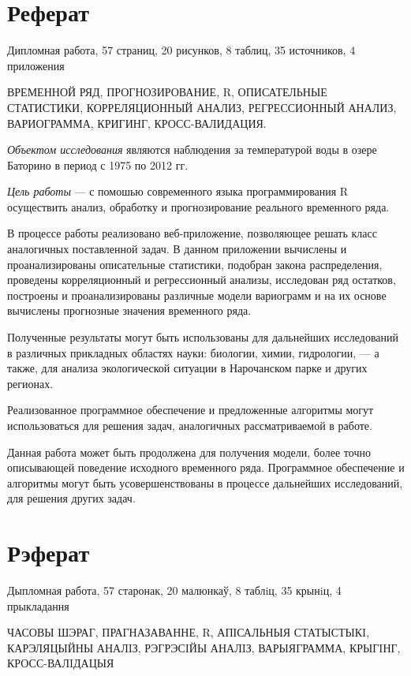 \newpage

\chapter*{Реферат}
Дипломная работа, 57 страниц, 20 рисунков, 8 таблиц, 35 источников, 4 приложения

ВРЕМЕННОЙ РЯД, ПРОГНОЗИРОВАНИЕ, R, ОПИСАТЕЛЬНЫЕ СТАТИСТИКИ, КОРРЕЛЯЦИОННЫЙ АНАЛИЗ, РЕГРЕССИОННЫЙ АНАЛИЗ, ВАРИОГРАММА, КРИГИНГ, КРОСС-ВАЛИДАЦИЯ.

\textit{Объектом исследования} являются наблюдения за температурой воды в озере Баторино в период с 1975 по 2012 гг.

\textit{Цель работы} --- с помошью современного языка программирования R осуществить анализ, обработку и прогнозирование реального временного ряда.

В процессе работы реализовано веб-приложение, позволяющее решать класс аналогичных поставленной задач. В данном приложении вычислены и проанализированы описательные статистики, подобран закона распределения, проведены корреляционный и регрессионный анализы, исследован ряд остатков, построены и проанализированы различные модели вариограмм и на их основе вычислены прогнозные значения временного ряда.

Полученные результаты могут быть использованы для дальнейших исследований в различных прикладных областях науки: биологии, химии, гидрологии, --- а также, для анализа экологической ситуации в Нарочанском парке и других регионах.

Реализованное программное обеспечение и предложенные алгоритмы могут использоваться для решения задач, аналогичных рассматриваемой в работе.

Данная работа может быть продолжена для получения модели, более точно описывающей поведение исходного временного ряда. Программное обеспечение и алгоритмы могут быть усовершенствованы в процессе дальнейших исследований, для решения других задач.

\newpage

\chapter*{Рэферат}
Дыпломная работа, 57 старонак, 20 малюнкаў, 8 таблiц, 35 крынiц, 4 прыкладання

ЧАСОВЫ ШЭРАГ, ПРАГНАЗАВАННЕ, R, АПІСАЛЬНЫЯ СТАТЫСТЫКI, КАРЭЛЯЦЫЙНЫ АНАЛIЗ, РЭГРЭСIЙЫ АНАЛIЗ, ВАРЫЯГРАММА, КРЫГIНГ, КРОСС-ВАЛIДАЦЫЯ

